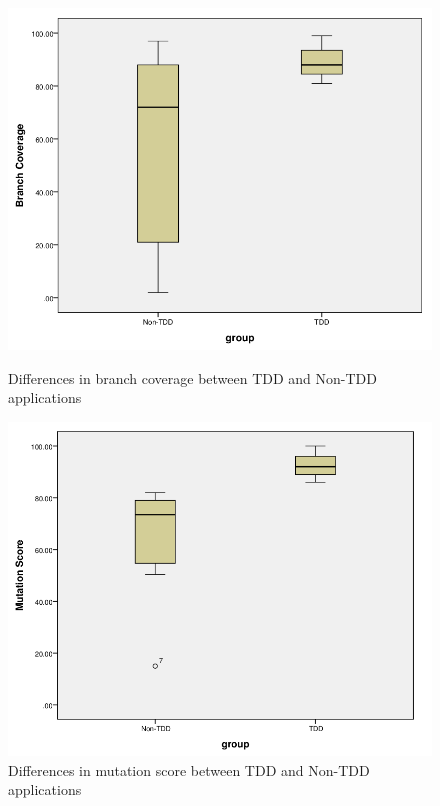 \documentclass[conference]{IEEEtran}
\begin{document}
\begin{figure}[t!]
\centering
\includegraphics[scale=.3]{groups_branch.png}
\caption{Differences in branch coverage between TDD and Non-TDD applications }
\label{figure:groups_branch}
\centering
\includegraphics[scale=.3]{groups_mutation.png}
\caption{Differences in mutation score between TDD and Non-TDD applications}
\label{figure:groups_mutation}
\end{figure}
\end{document}
